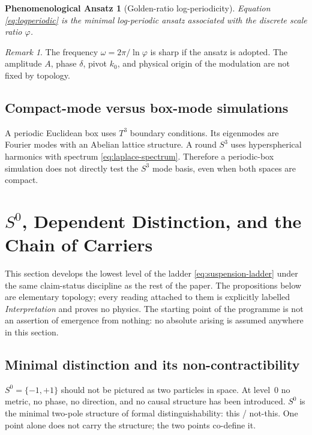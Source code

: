 \documentclass[11pt,a4paper]{article}
\newtheorem{ansatz}[theorem]{Phenomenological Ansatz}
\theoremstyle{definition}
\theoremstyle{remark}
\newtheorem{remark}[theorem]{Remark}
\newcommand{\Szero}{S^{0}}
\newcommand{\Sthree}{S^{3}}
\newcommand{\golden}{\varphi}
\begin{document}
\begin{ansatz}[Golden-ratio log-periodicity]
Equation \eqref{eq:logperiodic} is the minimal log-periodic ansatz associated with the discrete
scale ratio $\golden$.
\end{ansatz}

\begin{remark}
The frequency $\omega=2\pi/\ln\golden$ is sharp if the ansatz is adopted.  The amplitude $A$,
phase $\delta$, pivot $k_{0}$, and physical origin of the modulation are not fixed by topology.
\end{remark}

\subsection{Compact-mode versus box-mode simulations}

A periodic Euclidean box uses $T^{3}$ boundary conditions.  Its eigenmodes are Fourier modes
with an Abelian lattice structure.  A round $\Sthree$ uses hyperspherical harmonics with
spectrum \eqref{eq:laplace-spectrum}.  Therefore a periodic-box simulation does not directly
test the $\Sthree$ mode basis, even when both spaces are compact.

\section{\texorpdfstring{$\Szero$}{S0}, Dependent Distinction, and the Chain of Carriers}
\label{sec:s0-carriers}

This section develops the lowest level of the ladder \eqref{eq:suspension-ladder} under the same
claim-status discipline as the rest of the paper.  The propositions below are elementary
topology; every reading attached to them is explicitly labelled \emph{Interpretation} and proves
no physics.  The starting point of the programme is not an assertion of emergence from nothing:
no absolute arising is assumed anywhere in this section.

\subsection{Minimal distinction and its non-contractibility}

$\Szero=\{-1,+1\}$ should not be pictured as two particles in space.  At level~$0$ no metric,
no phase, no direction, and no causal structure has been introduced.  $\Szero$ is the minimal
two-pole structure of formal distinguishability: this / not-this.  One point alone does not carry
the structure; the two points co-define it.
\end{document}
